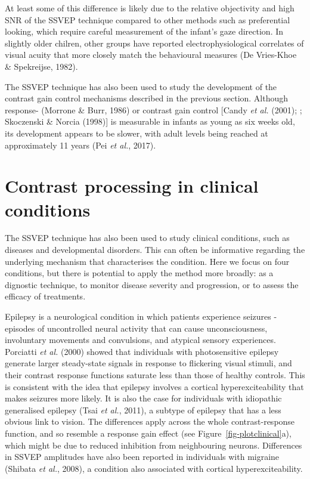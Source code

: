 \documentclass[
  letterpaper,
  DIV=11,
  numbers=noendperiod]{scrartcl}
\begin{document}
At least some of this difference is likely due to the relative
objectivity and high SNR of the SSVEP technique compared to other
methods such as preferential looking, which require careful measurement
of the infant's gaze direction. In slightly older chilren, other groups
have reported electrophysiological correlates of visual acuity that more
closely match the behavioural measures (De Vries-Khoe \& Spekreijse,
1982).

The SSVEP technique has also been used to study the development of the
contrast gain control mechanisms described in the previous section.
Although response- (Morrone \& Burr, 1986) or contrast gain control
{[}Candy \emph{et al.} (2001); ; Skoczenski \& Norcia (1998){]} is
measurable in infants as young as six weeks old, its development appears
to be slower, with adult levels being reached at approximately 11 years
(Pei \emph{et al.}, 2017).

\section{Contrast processing in clinical
conditions}\label{contrast-processing-in-clinical-conditions}

The SSVEP technique has also been used to study clinical conditions,
such as diseases and developmental disorders. This can often be
informative regarding the underlying mechanism that characterises the
condition. Here we focus on four conditions, but there is potential to
apply the method more broadly: as a dignostic technique, to monitor
disease severity and progression, or to assess the efficacy of
treatments.

Epilepsy is a neurological condition in which patients experience
seizures - episodes of uncontrolled neural activity that can cause
unconsciousness, involuntary movements and convulsions, and atypical
sensory experiences. Porciatti \emph{et al.} (2000) showed that
individuals with photosensitive epilepsy generate larger steady-state
signals in response to flickering visual stimuli, and their contrast
response functions saturate less than those of healthy controls. This is
consistent with the idea that epilepsy involves a cortical
hyperexciteability that makes seizures more likely. It is also the case
for individuals with idiopathic generalised epilepsy (Tsai \emph{et
al.}, 2011), a subtype of epilepsy that has a less obvious link to
vision. The differences apply across the whole contrast-response
function, and so resemble a response gain effect (see
Figure~\ref{fig-plotclinical}a), which might be due to reduced
inhibition from neighbouring neurons. Differences in SSVEP amplitudes
have also been reported in individuals with migraine (Shibata \emph{et
al.}, 2008), a condition also associated with cortical
hyperexciteability.
\end{document}
